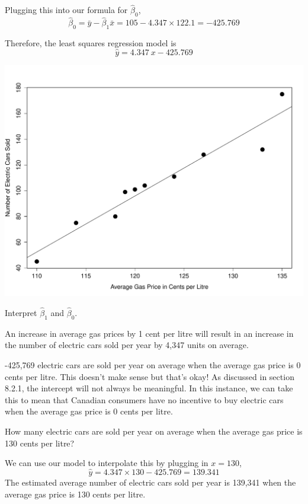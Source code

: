 \begin{example}
\begin{benumerate}
Plugging this into our formula for $\hat{\beta}_0$,
\[ \hat{\beta}_0 = \bar{y} - \hat{\beta}_1 \bar{x} = 105 - 4.347 \times 122.1 = -425.769\]

Therefore, the least squares regression model is
\[ \hat{y} = 4.347~x - 425.769\]

\begin{center}
\includegraphics[scale=0.45]{Section8/gaspricesreg.pdf}
\end{center}

\item Interpret $\hat{\beta}_1$ and $\hat{\beta}_0$.

An increase in average gas prices by 1 cent per litre will result in an increase in the number of electric cars sold per year by 4,347 units on average.

-425,769 electric cars are sold per year on average when the average gas price is 0 cents per litre. This doesn't make sense but that's okay! As discussed in section 8.2.1, the intercept will not always be meaningful. In this instance, we can take this to mean that Canadian consumers have no incentive to buy electric cars when the average gas price is 0 cents per litre.

\item How many electric cars are sold per year on average when the average gas price is 130 cents per litre?

We can use our model to interpolate this by plugging in $x=130$,
\[ \hat{y} = 4.347 \times 130 - 425.769 = 139.341\]
The estimated average number of electric cars sold per year is 139,341 when the average gas price is 130 cents per litre.


\end{benumerate}
\end{example}
